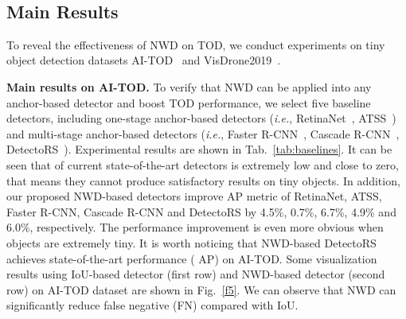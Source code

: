 \documentclass{article}
\newcommand{\fixedvskip}{-3mm}
\newcommand{\ie}{\textit{i.e.}}
\begin{document}
\begin{figure*}[h]
    \centering
    \\ \vspace{-0.2cm}
    \vspace{\fixedvskip}
    \caption{Visualization of detection results using IoU-based detector (first row) and NWD-based detector (second row) of AI-TOD dataset. The green, blue and red boxes denote true positive (TP), false positive (FP) and false negative (FN) predictions, respectively.}
    \label{f5}
    \vspace{\fixedvskip}
\end{figure*}



\subsection{Main Results}

To reveal the effectiveness of NWD on TOD, we conduct experiments on tiny object detection datasets AI-TOD~\cite{AI-TOD_2020_ICPR} and VisDrone2019~\cite{visdrone2019_2019_iccvw}.

\textbf{Main results on AI-TOD.} To verify that NWD can be applied into any anchor-based detector and boost TOD performance, we select five baseline detectors, including one-stage anchor-based detectors (\ie, RetinaNet~\cite{Focal-Loss_2017_ICCV}, ATSS~\cite{atss_2020_cvpr}) and multi-stage anchor-based detectors (\ie, Faster R-CNN~\cite{Faster-R-CNN_2015_NIPS}, Cascade R-CNN~\cite{Cascade-R-CNN_2018_CVPR}, DetectoRS~\cite{DetectoRS_2020_arXiv}). Experimental results are shown in Tab.~\ref{tab:baselines}. It can be seen that  of current state-of-the-art detectors is extremely low and close to zero, that means they cannot produce satisfactory results on tiny objects. In addition, our proposed NWD-based detectors improve AP metric of RetinaNet, ATSS, Faster R-CNN, Cascade R-CNN and DetectoRS by 4.5\%, 0.7\%, 6.7\%, 4.9\% and 6.0\%, respectively. The performance improvement is even more obvious when objects are extremely tiny. It is worth noticing that NWD-based DetectoRS achieves state-of-the-art performance ( AP) on AI-TOD.  Some visualization results using IoU-based detector (first row) and NWD-based detector (second row) on AI-TOD dataset are shown in Fig.~\ref{f5}. We can observe that NWD can significantly reduce false negative (FN) compared with IoU.
\end{document}
